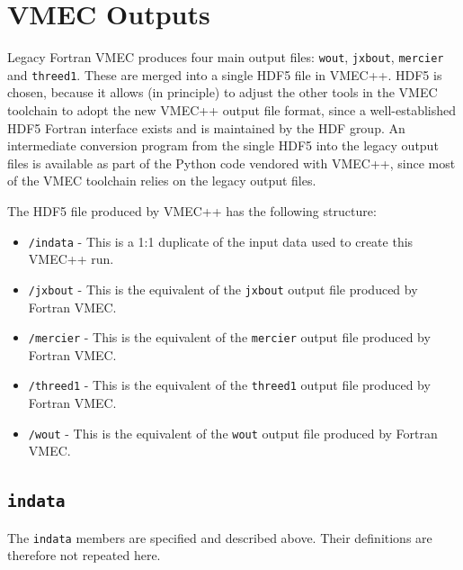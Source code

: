 \chapter{VMEC Outputs}

Legacy Fortran VMEC produces four main output files:
\texttt{wout},
\texttt{jxbout},
\texttt{mercier} and
\texttt{threed1}.
%
These are merged into a single HDF5 file in VMEC++.
HDF5 is chosen, because it allows (in principle)
to adjust the other tools in the VMEC toolchain
to adopt the new VMEC++ output file format,
since a well-established HDF5 Fortran interface exists
and is maintained by the HDF group.
%
An intermediate conversion program from the single HDF5
into the legacy output files is available as part of the Python code vendored with VMEC++,
since most of the VMEC toolchain relies on the legacy output files.

The HDF5 file produced by VMEC++ has the following structure:
\begin{itemize}
 \item \texttt{/indata} - This is a 1:1 duplicate of the input data used to create this VMEC++ run.
 \item \texttt{/jxbout} - This is the equivalent of the \texttt{jxbout} output file produced by Fortran VMEC.
 \item \texttt{/mercier} - This is the equivalent of the \texttt{mercier} output file produced by Fortran VMEC.
 \item \texttt{/threed1} - This is the equivalent of the \texttt{threed1} output file produced by Fortran VMEC.
 \item \texttt{/wout} - This is the equivalent of the \texttt{wout} output file produced by Fortran VMEC.
\end{itemize}

\section{\texttt{indata}}
The \texttt{indata} members are specified and described above.
Their definitions are therefore not repeated here.






